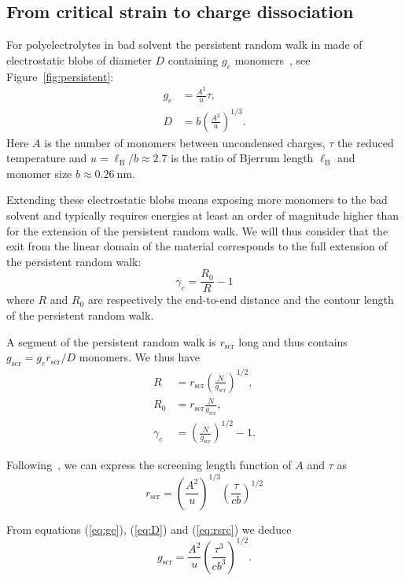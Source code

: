 \documentclass[12pt,a4paper,prl,reprint]{revtex4-1}
\begin{document}
\subsection{From critical strain to charge dissociation}

For polyelectrolytes in bad solvent the persistent random walk in made of electrostatic blobs of diameter $D$ containing $g_e$ monomers~\cite{Rubinstein1996}, see Figure~\ref{fig:persistent}:
\begin{align}
g_e &= \frac{A^2}{u}\tau\label{eq:ge},\\
D &= b \left(\frac{A^2}{u}\right)^{1/3}\label{eq:D}.
\end{align}
Here $A$ is the number of monomers between uncondensed charges, $\tau$ the reduced temperature and $u = \ell_\mathrm{B}/b \approx 2.7$ is the ratio of Bjerrum length $\ell_\mathrm{B}$ and monomer size $b\approx \SI{0.26}{\nano\metre}$. 

Extending these electrostatic blobs means exposing more monomers to the bad solvent and typically requires energies at least an order of magnitude higher than for the extension of the persistent random walk. We will thus consider that the exit from the linear domain of the material corresponds to the full extension of the persistent random walk:
\begin{equation}
\gamma_c = \frac{R_0}{R} - 1
\end{equation}
where $R$ and $R_0$ are respectively the end-to-end distance and the contour length of the persistent random walk.

A segment of the persistent random walk is $r_\mathrm{scr}$ long and thus contains $g_\mathrm{scr} = g_e r_\mathrm{scr}/D$ monomers. We thus have
\begin{align}
R &= r_\mathrm{scr} \left(\frac{N}{g_\mathrm{scr}}\right)^{1/2},\\
R_0 &= r_\mathrm{scr} \frac{N}{g_\mathrm{scr}},\\
\gamma_c &= \left(\frac{N}{g_\mathrm{scr}}\right)^{1/2} -1\label{eq:gamma0}.
\end{align}

Following~\cite{Rubinstein1996}, we can express the screening length function of $A$ and $\tau$ as
\begin{equation}
r_\mathrm{scr} = \left(\frac{A^2}{u}\right)^{1/3} \left(\frac{\tau}{cb}\right)^{1/2}
\label{eq:rsrc}
\end{equation}

From equations (\ref{eq:ge}), (\ref{eq:D}) and (\ref{eq:rsrc}) we deduce
\begin{equation}
g_\mathrm{scr} = \frac{A^2}{u} \left(\frac{\tau^3}{c b^3}\right)^{1/2}\label{eq:gscr}.
\end{equation}
\end{document}
